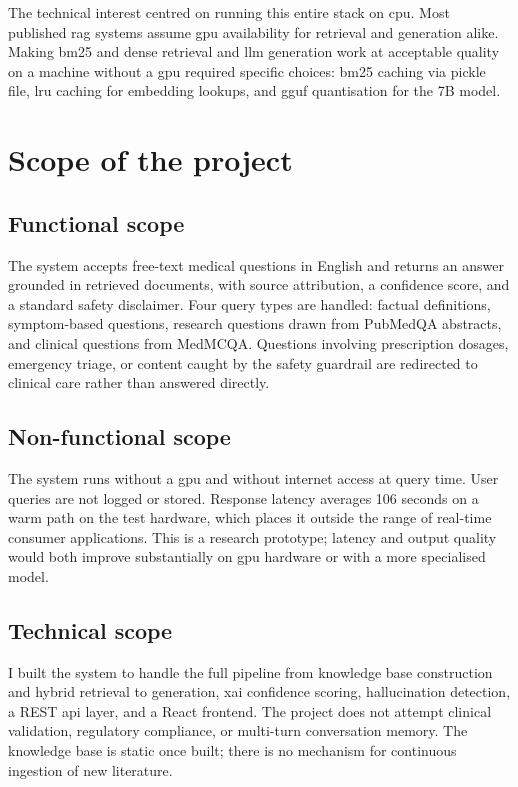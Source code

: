 The technical interest centred on running this entire stack on \ac{cpu}. Most published \ac{rag} systems assume \ac{gpu} availability for retrieval and generation alike. Making \ac{bm25} and dense retrieval and \ac{llm} generation work at acceptable quality on a machine without a \ac{gpu} required specific choices: \ac{bm25} caching via pickle file, \ac{lru} caching for embedding lookups, and \ac{gguf} quantisation for the 7B model.

\section{Scope of the project}

\subsection{Functional scope}

The system accepts free-text medical questions in English and returns an answer grounded in retrieved documents, with source attribution, a confidence score, and a standard safety disclaimer. Four query types are handled: factual definitions, symptom-based questions, research questions drawn from PubMedQA abstracts, and clinical questions from MedMCQA. Questions involving prescription dosages, emergency triage, or content caught by the safety guardrail are redirected to clinical care rather than answered directly.

\subsection{Non-functional scope}

The system runs without a \ac{gpu} and without internet access at query time. User queries are not logged or stored. Response latency averages 106 seconds on a warm path on the test hardware, which places it outside the range of real-time consumer applications. This is a research prototype; latency and output quality would both improve substantially on \ac{gpu} hardware or with a more specialised model.

\subsection{Technical scope}

I built the system to handle the full pipeline from knowledge base construction and hybrid retrieval to generation, \ac{xai} confidence scoring, hallucination detection, a REST \ac{api} layer, and a React frontend. The project does not attempt clinical validation, regulatory compliance, or multi-turn conversation memory. The knowledge base is static once built; there is no mechanism for continuous ingestion of new literature.

